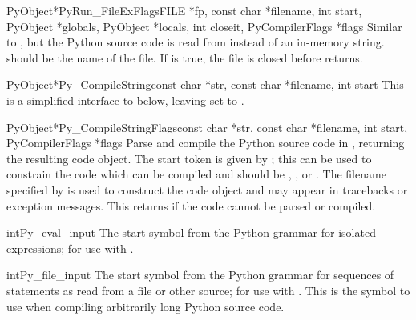 \begin{cfuncdesc}{PyObject*}{PyRun_FileExFlags}{FILE *fp, const char *filename,
                                                int start, PyObject *globals,
                                                PyObject *locals, int closeit,
                                                PyCompilerFlags *flags}
  Similar to , but the Python source code is
  read from  instead of an in-memory string.
   should be the name of the file.
  If  is true, the file is closed before
   returns.
\end{cfuncdesc}

\begin{cfuncdesc}{PyObject*}{Py_CompileString}{const char *str,
                                               const char *filename,
                                               int start}
  This is a simplified interface to  below,
  leaving  set to \NULL.
\end{cfuncdesc}

\begin{cfuncdesc}{PyObject*}{Py_CompileStringFlags}{const char *str,
                                                    const char *filename,
                                                    int start,
                                                    PyCompilerFlags *flags}
  Parse and compile the Python source code in , returning the
  resulting code object.  The start token is given by ;
  this can be used to constrain the code which can be compiled and should
  be , , or
  .  The filename specified by
   is used to construct the code object and may appear
  in tracebacks or  exception messages.  This
  returns \NULL{} if the code cannot be parsed or compiled.
\end{cfuncdesc}

\begin{cvardesc}{int}{Py_eval_input}
  The start symbol from the Python grammar for isolated expressions;
  for use with
  .
\end{cvardesc}

\begin{cvardesc}{int}{Py_file_input}
  The start symbol from the Python grammar for sequences of statements
  as read from a file or other source; for use with
  .  This is
  the symbol to use when compiling arbitrarily long Python source code.
\end{cvardesc}


